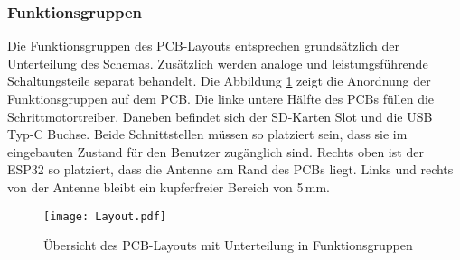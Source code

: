 \subsubsection{Funktionsgruppen}
\label{sec:Funktionsblocke}

Die Funktionsgruppen des PCB-Layouts entsprechen grundsätzlich der Unterteilung des Schemas.
Zusätzlich werden analoge und leistungsführende Schaltungsteile separat behandelt.
Die Abbildung \ref{pic:Layout_Block} zeigt die Anordnung der Funktionsgruppen auf dem PCB.
Die linke untere Hälfte des PCBs füllen die Schrittmotortreiber.
Daneben befindet sich der SD-Karten Slot und die USB Typ-C Buchse.
Beide Schnittstellen müssen so platziert sein, dass sie im eingebauten Zustand für den Benutzer zugänglich sind.
Rechts oben ist der ESP32 so platziert, dass die Antenne am Rand des PCBs liegt. Links und rechts von der Antenne bleibt ein kupferfreier Bereich von 5\,mm.

\begin{figure}[h]
	\centering
	\texttt{[image: Layout.pdf]}
	\caption{Übersicht des PCB-Layouts mit Unterteilung in Funktionsgruppen}
	\label{pic:Layout_Block}
\end{figure}
